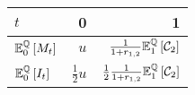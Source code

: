 \documentclass[main.tex]{subfiles}
\begin{document}
            \begin{table}[H]
                \centering
                \begin{tabular}{l|rr}
                    $t$ & 0 & 1 \\
                    \hline
                    \rule{0pt}{1.3em}
                    $\mathbb{E}_{0}^{\mathbb{Q}}\left[M_t\right]$ & $u$ & $\frac{1}{1+r_{1,2}}\mathbb{E}_{1}^{\mathbb{Q}}\left[\mathcal{C}_{2}\right]$ \\
                    \rule{0pt}{1.3em}
                    $\mathbb{E}_{0}^{\mathbb{Q}}\left[I_t\right]$ & $\frac{1}{2}u$ & $\frac{1}{2}\frac{1}{1+r_{1,2}}\mathbb{E}_{1}^{\mathbb{Q}}\left[\mathcal{C}_{2}\right]$ \\
                \end{tabular}
                \caption{}
                \label{tbl:swap-margin-postings}
            \end{table}
\end{document}
